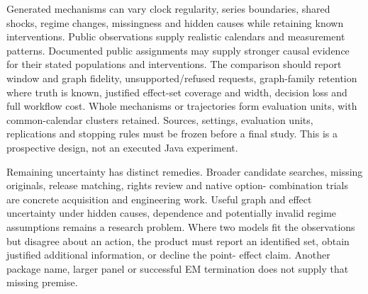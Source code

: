 Generated mechanisms can vary clock regularity, series boundaries, shared
shocks, regime changes, missingness and hidden causes while retaining known
interventions. Public observations supply realistic calendars and measurement
patterns. Documented public assignments may supply stronger causal evidence
for their stated populations and interventions. The comparison should report
window and graph fidelity, unsupported/refused requests, graph-family
retention where truth is known, justified effect-set coverage and width,
decision loss and full workflow cost. Whole mechanisms or trajectories form
evaluation units, with common-calendar clusters retained. Sources, settings,
evaluation units, replications and stopping rules must be frozen before a
final study. This is a prospective design, not an executed Java experiment.
\citep{exec15_javatemporal_design}

Remaining uncertainty has distinct remedies. Broader candidate searches,
missing originals, release matching, rights review and native option-
combination trials are concrete acquisition and engineering work. Useful graph
and effect uncertainty under hidden causes, dependence and potentially invalid
regime assumptions remains a research problem. Where two models fit the
observations but disagree about an action, the product must report an
identified set, obtain justified additional information, or decline the point-
effect claim. Another package name, larger panel or successful EM termination
does not supply that missing premise.~\citep{exec15_javatemporal_design}
\label{exec15:java-temporal-end}
